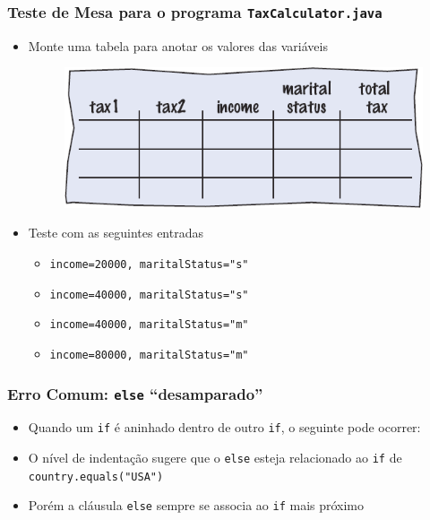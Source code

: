 \documentclass[xcolor={dvipsnames,table},aspectratio=169]{beamer}
\begin{document}
\begin{frame}\frametitle{Teste de Mesa para o programa \texttt{TaxCalculator.java}}
\begin{itemize}
	\item Monte uma tabela para anotar os valores das variáveis
\begin{figure}[h]
	\includegraphics[height=0.30\paperheight,center]{pucrs-ep-fprog-unidade_03-decisoes-laminas-tabela.png}
\end{figure}
	\item Teste com as seguintes entradas
	\begin{itemize}
		\item \texttt{income=20000, maritalStatus="s"}
		\item \texttt{income=40000, maritalStatus="s"}
		\item \texttt{income=40000, maritalStatus="m"}
		\item \texttt{income=80000, maritalStatus="m"}
	\end{itemize}
\end{itemize}
\end{frame}

\begin{frame}[fragile]\frametitle{Erro Comum: \texttt{else} ``desamparado''}
\begin{itemize}
	\item Quando um \texttt{if} é aninhado dentro de outro \texttt{if}, o seguinte pode ocorrer:
	\item O nível de indentação sugere que o \texttt{else} esteja relacionado ao \texttt{if} de \texttt{country.equals("USA")}
	\item Porém a cláusula \texttt{else} sempre se associa ao \texttt{if} mais próximo
\end{itemize}
\end{frame}
\end{document}
